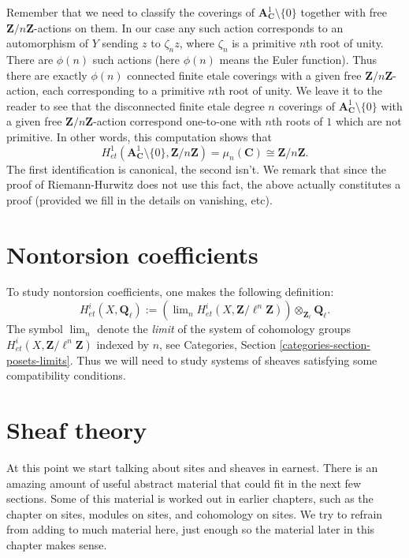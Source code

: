 \medskip\noindent
Remember that we need to classify the coverings of
${\mathbf{A}^1_\mathbf{C} \setminus \{0\}}$ together with free
$\mathbf{Z}/n\mathbf{Z}$-actions on them.
In our case any such action corresponds
to an automorphism of $Y$ sending $z$ to $\zeta_n z$, where $\zeta_n$ is a
primitive $n$th root of unity. There are $\phi(n)$ such actions
(here $\phi(n)$ means the Euler function). Thus there are exactly
$\phi(n)$ connected finite etale coverings with a given free
$\mathbf{Z}/n\mathbf{Z}$-action, each corresponding to a primitive
$n$th root of unity. We leave it to the reader to see that the
disconnected finite etale degree $n$ coverings of
$\mathbf{A}^1_{\mathbf{C}} \setminus \{0\}$ with a given free
$\mathbf{Z}/n\mathbf{Z}$-action correspond one-to-one with $n$th
roots of $1$ which are not primitive.
In other words, this computation shows that
$$
H_{et}^1 (\mathbf{A}^1_\mathbf{C} \setminus \{0\}, \mathbf{Z}/n\mathbf{Z})
= \mu_n(\mathbf{C}) \cong \mathbf{Z}/n\mathbf{Z}.
$$
The first identification is canonical, the second isn't. We remark that
since the proof of Riemann-Hurwitz does not use this fact, the above actually
constitutes a proof (provided we fill in the details on vanishing, etc).




\section{Nontorsion coefficients}
\label{section-nontorsion}

\noindent
To study nontorsion coefficients, one makes the following definition:
$$
H_{et}^i (X, \mathbf{Q}_\ell) :=
\left( \lim\nolimits_n H_{et}^i(X, \mathbf{Z}/\ell^n\mathbf{Z}) \right)
\otimes_{\mathbf{Z}_\ell} \mathbf{Q}_\ell.
$$
The symbol $\lim_n$ denote the {\it limit} of the system of
cohomology groups $H_{et}^i(X, \mathbf{Z}/\ell^n\mathbf{Z})$ indexed
by $n$, see
Categories, Section \ref{categories-section-posets-limits}.
Thus we will need to study systems of sheaves satisfying some compatibility
conditions. 




\section{Sheaf theory}
\label{section-sheaf-theory}

\noindent
At this point we start talking about sites and sheaves in earnest.
There is an amazing amount of useful abstract material that could fit
in the next few sections. Some of this material is worked out in earlier
chapters, such as the chapter on sites, modules on sites, and cohomology
on sites. We try to refrain from adding to much material here, just
enough so the material later in this chapter makes sense.




